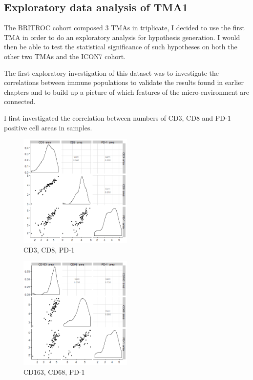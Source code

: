 \subsection{Exploratory data analysis of TMA1}

The BRITROC cohort composed 3 TMAs in triplicate, I decided to use the first TMA in order to do an exploratory analysis for hypothesis generation. I would then be able to test the statistical significance of such hypotheses on both the other two TMAs and the ICON7 cohort. 

The first exploratory investigation of this dataset was to investigate the correlations between immune populations to validate the results found in earlier chapters and to build up a picture of which features of the micro-environment are connected.

I first investigated the correlation between numbers of CD3, CD8 and PD-1 positive cell areas in samples.

\begin{figure}
    \centering
    \includegraphics[width=0.5\textwidth]{Chapter4/figs/BRITROC_CD3_CD8_PD-1_corr.png}
    \caption{CD3, CD8, PD-1}
    \label{fig:CD8_CD3_PD1}
\end{figure}

\begin{figure}
    \centering
    \includegraphics[width=0.5\textwidth]{Chapter4/figs/BRITROC_CD163_CD68_PD-1_corr.png}
    \caption{CD163, CD68, PD-1}
    \label{fig:CD163_CD8_PD1}
\end{figure}

